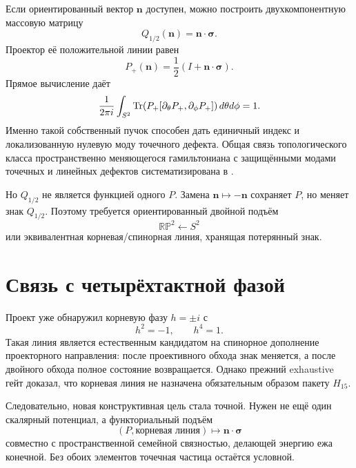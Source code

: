 Если ориентированный вектор $\mathbf n$ доступен, можно построить
двухкомпонентную массовую матрицу
\begin{equation}
 Q_{1/2}(\mathbf n)=\mathbf n\cdot\boldsymbol\sigma.
 \label{eq:v5-spinor-hedgehog-mass}
\end{equation}
Проектор её положительной линии равен
\begin{equation}
 P_+(\mathbf n)=\frac12(I+\mathbf n\cdot\boldsymbol\sigma).
\end{equation}
Прямое вычисление даёт
\begin{equation}
 \frac1{2\pi i}\int_{S^2}
 \operatorname{Tr}\!\left(P_+[\partial_\theta P_+,\partial_\phi P_+]\right)
 d\theta d\phi=1.
 \label{eq:v5-spinor-projector-chern-one}
\end{equation}
Именно такой собственный пучок способен дать единичный индекс и
локализованную нулевую моду точечного дефекта. Общая связь топологического
класса пространственно меняющегося гамильтониана с защищёнными модами
точечных и линейных дефектов систематизирована в
.

Но $Q_{1/2}$ не является функцией одного $P$. Замена
$\mathbf n\mapsto-\mathbf n$ сохраняет $P$, но меняет знак
$Q_{1/2}$. Поэтому требуется ориентированный двойной подъём
\begin{equation}
 \mathbb{RP}^2\longleftarrow S^2
\end{equation}
или эквивалентная корневая/спинорная линия, хранящая потерянный знак.

\section{Связь с четырёхтактной фазой}

Проект уже обнаружил корневую фазу $h=\pm i$ с
\begin{equation}
 h^2=-1,
 \qquad h^4=1.
\end{equation}
Такая линия является естественным кандидатом на спинорное дополнение
проекторного направления: после проективного обхода знак меняется, а после
двойного обхода полное состояние возвращается. Однако прежний exhaustive
гейт доказал, что корневая линия не назначена обязательным образом пакету
$H_{15}$.

Следовательно, новая конструктивная цель стала точной. Нужен не ещё один
скалярный потенциал, а функториальный подъём
\begin{equation}
 (P,\text{корневая линия})
 \longmapsto
 \mathbf n\cdot\boldsymbol\sigma
 \label{eq:v5-projector-spinor-lift-target}
\end{equation}
совместно с пространственной семейной связностью, делающей энергию ежа
конечной. Без обоих элементов точечная частица остаётся условной.

